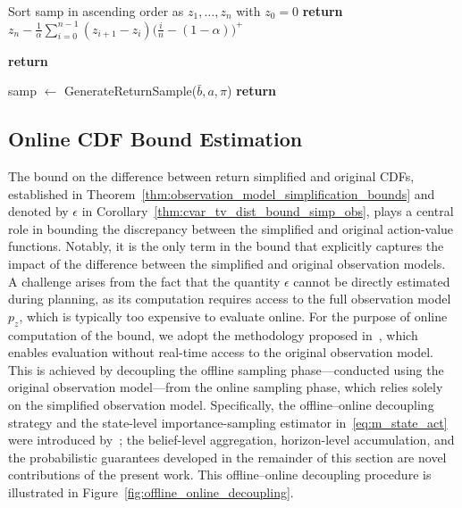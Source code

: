 \documentclass[acmlarge, manuscript, screen, review, natbib=false, oneside]{acmart}
\begin{document}
\begin{algorithm*}[tb]
\begin{minipage}[t]{0.48\textwidth}
\begin{algorithmic}[1]
		\State Sort samp in ascending order as $z_1,\dots,z_n$ with $z_0=0$
		\State \textbf{return} $z_n - \tfrac{1}{\alpha}\sum_{i=0}^{n-1}(z_{i+1}-z_i)\bigl(\tfrac{i}{n}-(1-\alpha)\bigr)^+$
		\EndProcedure

		\State \textbf{return} 
		\EndProcedure

		\State samp $\gets$ GenerateReturnSample($\bar{b}, a, \pi$)
		\State \textbf{return} 
		\EndProcedure
	\end{algorithmic}
	\end{minipage}
\end{algorithm*}

\subsection{Online CDF Bound Estimation}\label{sec:cdf_bound_estimation}
The bound on the difference between return simplified and original CDFs, established in Theorem~\ref{thm:observation_model_simplification_bounds} and denoted by $\epsilon$ in Corollary~\ref{thm:cvar_tv_dist_bound_simp_obs}, plays a central role in bounding the discrepancy between the simplified and original action-value functions. Notably, it is the only term in the bound that explicitly captures the impact of the difference between the simplified and original observation models. A challenge arises from the fact that the quantity $\epsilon$ cannot be directly estimated during planning, as its computation requires access to the full observation model $p_z$, which is typically too expensive to evaluate online. For the purpose of online computation of the bound, we adopt the methodology proposed in~\cite{LevYehudi24aaai}, which enables evaluation without real-time access to the original observation model. This is achieved by decoupling the offline sampling phase—conducted using the original observation model—from the online sampling phase, which relies solely on the simplified observation model. Specifically, the offline–online decoupling strategy and the state-level importance-sampling estimator in~\eqref{eq:m_state_act} were introduced by~\cite{LevYehudi24aaai}; the belief-level aggregation, horizon-level accumulation, and the probabilistic guarantees developed in the remainder of this section are novel contributions of the present work. This offline--online decoupling procedure is illustrated in Figure~\ref{fig:offline_online_decoupling}.
\end{document}

